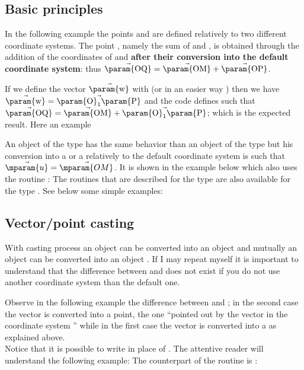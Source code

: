\documentclass[pdftex]{article}
\begin{document}
\subsection{Basic principles}
In the following example the points  and  are
defined relatively to two different coordinate systems. The
point , namely the sum of  and , is
obtained through the addition of the coordinates of 
and  \textbf{after their conversion into the default
  coordinate system}: thus  $\vec{\mbox{\param{OQ}}}=\vec{\mbox{\param{OM}}}+\vec{\mbox{\param{OP}}}$.

{}
If we define the vector  $\vec{\mbox{\param{w}}}$ with  (or in an easier way
) then we have
$\vec{\mbox{\param{w}}}=\vec{\mbox{\param{O}}_{1}\mbox{\param{P}}}$
and the code  defines   such that
$\vec{\mbox{\param{OQ}}}=\vec{\mbox{\param{OM}}}+\vec{\mbox{\param{O}}_{1}\mbox{\param{P}}}$;
which is the expected result. Here an example

{}
An object  of the type  has the same behavior
than an object of the type  but his conversion into
a  or a   relatively to the default
coordinate system is such that
$\vec{\mparam{u}}=\vec{\mparam{OM}}$. It is shown in the example below
which also uses the routine  :
{}
The routines that are described for the type  are also
available for the type . See below some simple examples:
\subsection{Vector/point casting}

With casting process an object  can be
converted into an object  and mutually
an object  can be converted into an object
. If I may repeat myself it is important to
understand that the difference between  and 
does not exist if you do not use another coordinate system than the
default one.


Observe in the following example the difference between   and
; in the second case the vector is converted into
a point, the one ``pointed out by the vector in the coordinate
system '' while in the first case the
vector is converted into a  as explained above.\\
Notice that it is possible to write   in
place of .
The attentive reader will understand the following example:
The counterpart of the routine   is
:
\end{document}
